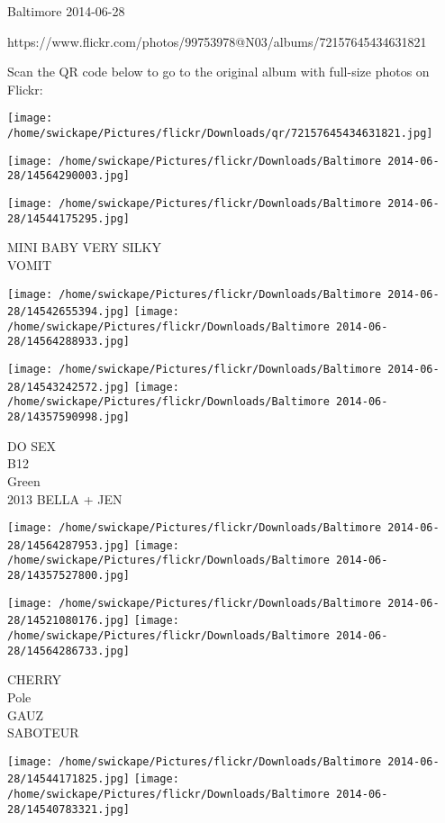 \documentclass[10pt,letterpaper]{article}
\begin{document}
Baltimore 2014-06-28

https://www.flickr.com/photos/99753978@N03/albums/72157645434631821

Scan the QR code below to go to the original album with full-size photos on Flickr:

\texttt{[image: /home/swickape/Pictures/flickr/Downloads/qr/72157645434631821.jpg]}
\pagebreak

\texttt{[image: /home/swickape/Pictures/flickr/Downloads/Baltimore 2014-06-28/14564290003.jpg]}

\vspace{0.25in}
\texttt{[image: /home/swickape/Pictures/flickr/Downloads/Baltimore 2014-06-28/14544175295.jpg]}

MINI BABY VERY SILKY\\
VOMIT\\
\pagebreak

\texttt{[image: /home/swickape/Pictures/flickr/Downloads/Baltimore 2014-06-28/14542655394.jpg]}
\texttt{[image: /home/swickape/Pictures/flickr/Downloads/Baltimore 2014-06-28/14564288933.jpg]}

\texttt{[image: /home/swickape/Pictures/flickr/Downloads/Baltimore 2014-06-28/14543242572.jpg]}
\texttt{[image: /home/swickape/Pictures/flickr/Downloads/Baltimore 2014-06-28/14357590998.jpg]}

DO SEX\\
B12\\
Green\\
2013 BELLA + JEN\\
\pagebreak

\texttt{[image: /home/swickape/Pictures/flickr/Downloads/Baltimore 2014-06-28/14564287953.jpg]}
\texttt{[image: /home/swickape/Pictures/flickr/Downloads/Baltimore 2014-06-28/14357527800.jpg]}

\texttt{[image: /home/swickape/Pictures/flickr/Downloads/Baltimore 2014-06-28/14521080176.jpg]}
\texttt{[image: /home/swickape/Pictures/flickr/Downloads/Baltimore 2014-06-28/14564286733.jpg]}

CHERRY\\
Pole\\
GAUZ\\
SABOTEUR\\
\pagebreak

\texttt{[image: /home/swickape/Pictures/flickr/Downloads/Baltimore 2014-06-28/14544171825.jpg]}
\texttt{[image: /home/swickape/Pictures/flickr/Downloads/Baltimore 2014-06-28/14540783321.jpg]}
\end{document}
